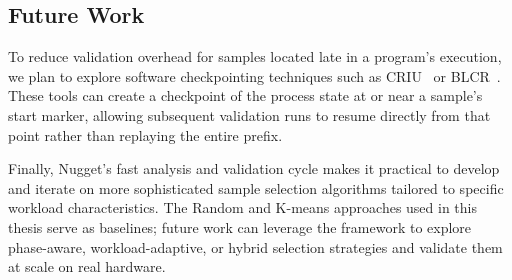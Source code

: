 \subsection{Future Work}

To reduce validation overhead for samples located late in a program's execution, we plan to explore software checkpointing techniques such as CRIU~\cite{CRIU} or BLCR~\cite{BLCR}.
These tools can create a checkpoint of the process state at or near a sample's start marker, allowing subsequent validation runs to resume directly from that point rather than replaying the entire prefix.

Finally, Nugget's fast analysis and validation cycle makes it practical to develop and iterate on more sophisticated sample selection algorithms tailored to specific workload characteristics.
The Random and K-means approaches used in this thesis serve as baselines; future work can leverage the framework to explore phase-aware, workload-adaptive, or hybrid selection strategies and validate them at scale on real hardware.
